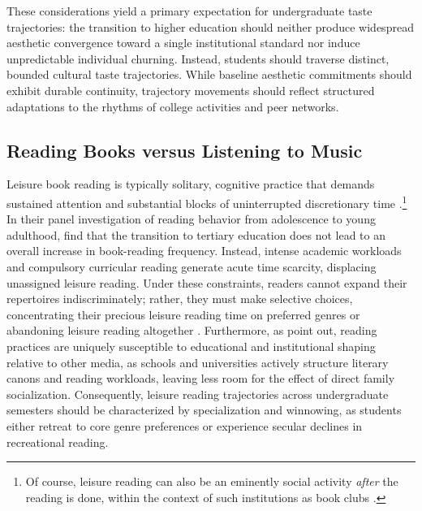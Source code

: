 \documentclass[12pt]{article}
\begin{document}
These considerations yield a primary expectation for undergraduate taste trajectories: the transition to higher education should neither produce widespread aesthetic convergence toward a single institutional standard nor induce unpredictable individual churning. Instead, students should traverse distinct, bounded cultural taste trajectories. While baseline aesthetic commitments should exhibit durable continuity, trajectory movements should reflect structured adaptations to the rhythms of college activities and peer networks.

\subsection{Reading Books versus Listening to Music}

Leisure book reading is typically solitary, cognitive practice that demands sustained attention and substantial blocks of uninterrupted discretionary time \citep{kraaykamp2003literary,chalari2022adolescents}.\footnote{Of course, leisure reading can also be an eminently social activity \textit{after} the reading is  done, within the context of such institutions as book clubs \citep{long2003book-a38, childress2012cultural-0cc}.} In their panel investigation of reading behavior from adolescence to young adulthood, \citet{nagel2012reading} find that the transition to tertiary education does not lead to an overall increase in book-reading frequency. Instead, intense academic workloads and compulsory curricular reading generate acute time scarcity, displacing unassigned leisure reading. Under these constraints, readers cannot expand their repertoires indiscriminately; rather, they must make selective choices, concentrating their precious leisure reading time on preferred genres or abandoning leisure reading altogether \citep{kraaykamp2003literary, sokolova2020does-65c}. Furthermore, as \citet{meuleman2018parental} point out, reading practices are uniquely susceptible to educational and institutional shaping relative to other media, as schools and universities actively structure literary canons and reading workloads, leaving less room for the effect of direct family socialization. Consequently, leisure reading trajectories across undergraduate semesters should be characterized by specialization and winnowing, as students either retreat to core genre preferences or experience secular declines in recreational reading.
\end{document}

